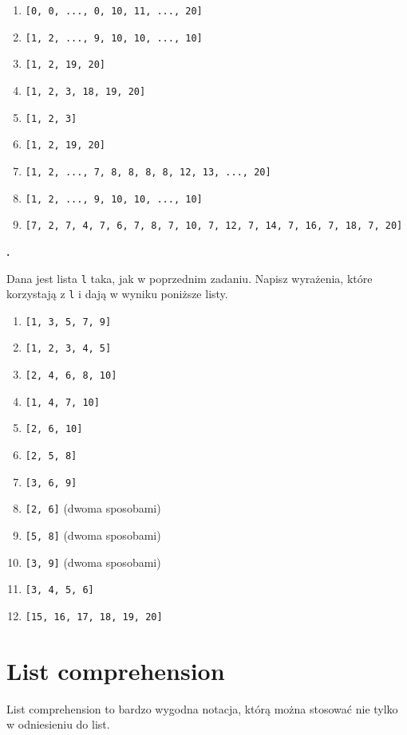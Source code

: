 \documentclass[a4paper]{article}
\begin{document}
\begin{enumerate}[label=\arabic*.]
    \item \verb|[0, 0, ..., 0, 10, 11, ..., 20]|
    \item \verb|[1, 2, ..., 9, 10, 10, ..., 10]|
    \item \verb|[1, 2, 19, 20]|
    \item \verb|[1, 2, 3, 18, 19, 20]|
    \item \verb|[1, 2, 3]|
    \item \verb|[1, 2, 19, 20]|
    \item \verb|[1, 2, ..., 7, 8, 8, 8, 8, 12, 13, ..., 20]|
    \item \verb|[1, 2, ..., 9, 10, 10, ..., 10]|
    \item \verb|[7, 2, 7, 4, 7, 6, 7, 8, 7, 10, 7, 12, 7, 14, 7, 16, 7, 18, 7, 20]|

\end{enumerate}

\textbf{.}\addtocounter{zadanie}{1} Dana jest lista \verb|l| taka, jak w poprzednim zadaniu. Napisz wyrażenia, które korzystają z \verb|l| i dają w wyniku poniższe listy.

\begin{multicols}{2}
\begin{enumerate}[label=\arabic*.]
    \item \verb |[1, 3, 5, 7, 9]|
    \item \verb |[1, 2, 3, 4, 5]|
    \item \verb |[2, 4, 6, 8, 10]|
    \item \verb |[1, 4, 7, 10]|
    \item \verb |[2, 6, 10]|
    \item \verb |[2, 5, 8]|
    \item \verb |[3, 6, 9]|
    \item \verb |[2, 6]| (dwoma sposobami)
    \item \verb |[5, 8]| (dwoma sposobami)
    \item \verb |[3, 9]| (dwoma sposobami)
    \item \verb |[3, 4, 5, 6]|
    \item \verb |[15, 16, 17, 18, 19, 20]|
\end{enumerate}
\end{multicols}


\section{List comprehension}
List comprehension to bardzo wygodna notacja, którą można stosować nie tylko w odniesieniu do list.
\end{document}
